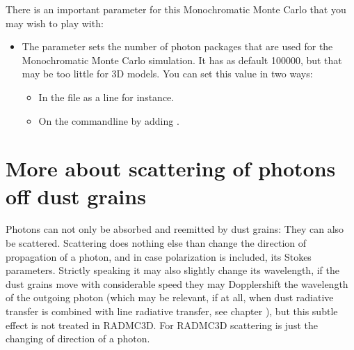 \documentclass[letterpaper,10pt,english]{sphinxmanual}
\begin{document}
There is an important parameter for this Monochromatic Monte Carlo that you
may wish to play with:
\begin{itemize}
\item {} 
The parameter  sets the number of photon packages
that are used for the Monochromatic Monte Carlo simulation. It has as
default 100000, but that may be too little for 3\sphinxhyphen{}D models. You can set
this value in two ways:
\begin{itemize}
\item {} 
In the  file as a line  for instance.

\item {} 
On the command\sphinxhyphen{}line by adding .

\end{itemize}

\end{itemize}


\section{More about scattering of photons off dust grains}
\label{\detokenize{dustradtrans:more-about-scattering-of-photons-off-dust-grains}}\label{\detokenize{dustradtrans:sec-scattering}}
Photons can not only be absorbed and re\sphinxhyphen{}emitted by dust grains: They can also be
scattered. Scattering does nothing else than change the direction of propagation
of a photon, and in case polarization is included, its Stokes
parameters. Strictly speaking it may also slightly change its wavelength, if the
dust grains move with considerable speed they may Doppler\sphinxhyphen{}shift the wavelength
of the outgoing photon (which may be relevant, if at all, when dust radiative
transfer is combined with line radiative transfer, see chapter
{\hyperref[\detokenize{lineradtrans:chap-line-transfer}]{}}), but this subtle effect is not treated in
RADMC\sphinxhyphen{}3D. For RADMC\sphinxhyphen{}3D scattering is just the changing of direction of a photon.
\end{document}
